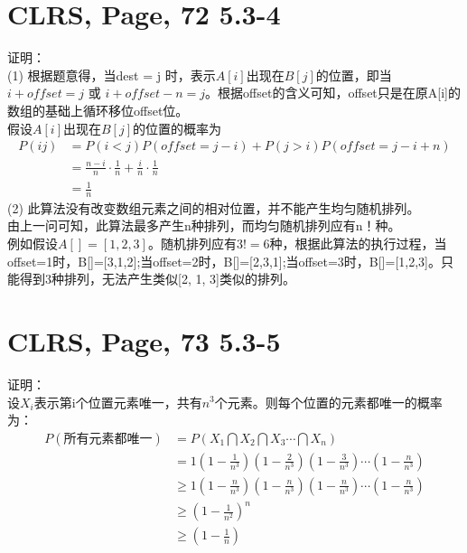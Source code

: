 \documentclass[UTF8]{ctexart}
\begin{document}
\section{CLRS, Page, 72 5.3-4}

证明：\\
(1) 根据题意得，当dest = j 时，表示$A[i]$出现在$B[j]$的位置，即当$i+offset = j$ 或 $i+offset-n = j$。根据offset的含义可知，offset只是在原A[i]的数组的基础上循环移位offset位。\\
假设$A[i]$出现在$B[j]$的位置的概率为
\begin{align*}
    P(ij) &= P(i<j)P(offset=j-i)+P(j>i)P(offset=j-i+n) \\
    &= \frac{n-i}{n}\cdot \frac{1}{n}+\frac{i}{n}\cdot \frac{1}{n}\\
    &= \frac{1}{n}
\end{align*}
(2) 此算法没有改变数组元素之间的相对位置，并不能产生均匀随机排列。\\
由上一问可知，此算法最多产生n种排列，而均匀随机排列应有n！种。\\
例如假设$A[]={[1,2,3]}$。随机排列应有$3!=6$种，根据此算法的执行过程，当offset=1时，B[]=[3,1,2];当offset=2时，B[]=[2,3,1];当offset=3时，B[]=[1,2,3]。只能得到3种排列，无法产生类似[2, 1, 3]类似的排列。


\section{CLRS, Page, 73 5.3-5}

证明： \\
设$X_i$表示第i个位置元素唯一，共有$n^3$个元素。则每个位置的元素都唯一的概率为：
\begin{align*}
    P(\text{所有元素都唯一}) &= P(X_1\bigcap X_2\bigcap X_3 \cdots \bigcap X_n) \\
        &= 1(1-\frac{1}{n^3})(1-\frac{2}{n^3})(1-\frac{3}{n^3})\cdots(1-\frac{n}{n^3})\\
        &\geq 1(1-\frac{n}{n^3})(1-\frac{n}{n^3})(1-\frac{n}{n^3})\cdots(1-\frac{n}{n^3})\\
        &\geq (1-\frac{1}{n^2})^n\\
        &\geq (1-\frac{1}{n})
\end{align*}
\end{document}
